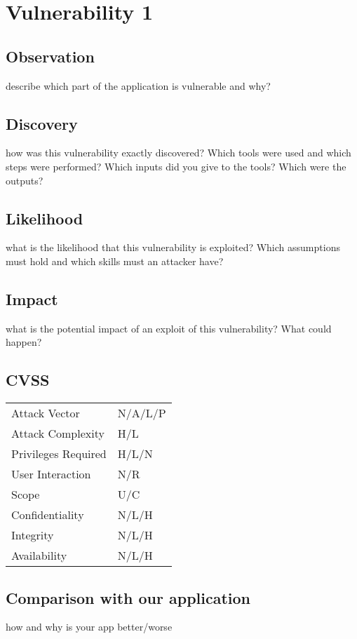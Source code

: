 \section{Vulnerability 1}
\subsection{Observation}
describe which part of the application is vulnerable and why?

\subsection{Discovery}
how was this vulnerability exactly discovered? Which tools were used and which
steps were performed? Which inputs did you give to the tools? Which were the outputs?

\subsection{Likelihood}
what is the likelihood that this vulnerability is exploited? Which assumptions must hold and which skills must an attacker have?

\subsection{Impact}
what is the potential impact of an exploit of this vulnerability? What could happen?

\subsection{CVSS}
\begin{tabular}{l | l}
Attack Vector		& N/A/L/P \\
Attack Complexity	& H/L \\
Privileges Required & H/L/N \\
User Interaction	& N/R \\
Scope				& U/C \\
Confidentiality		& N/L/H \\
Integrity			& N/L/H \\
Availability		& N/L/H
\end{tabular}

\subsection{Comparison with our application}
how and why is your app better/worse
\clearpage